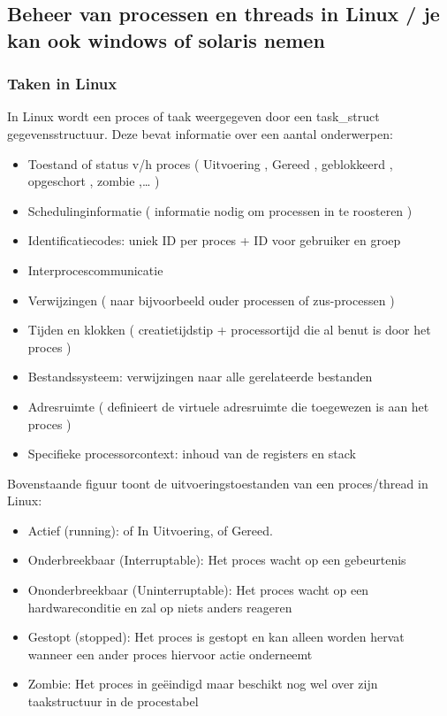 \subsection{Beheer van processen en threads in Linux / je kan ook windows of solaris nemen}

\subsubsection{Taken in Linux}

In Linux wordt een proces of taak weergegeven door een task\_struct gegevensstructuur. Deze bevat informatie over een aantal onderwerpen:

















\begin{itemize}
\item Toestand of status v/h proces ( Uitvoering , Gereed , geblokkeerd , opgeschort , zombie ,… )
\item Schedulinginformatie ( informatie nodig om processen in te roosteren )
\item Identificatiecodes: uniek ID per proces + ID voor gebruiker en groep
\item Interprocescommunicatie
\item Verwijzingen ( naar bijvoorbeeld ouder processen of zus-processen )
\item Tijden en klokken ( creatietijdstip + processortijd die al benut is door het proces )
\item Bestandssysteem: verwijzingen naar alle gerelateerde bestanden
\item Adresruimte ( definieert de virtuele adresruimte die toegewezen is aan het proces )
\item Specifieke processorcontext: inhoud van de registers en stack
\end{itemize}

Bovenstaande figuur toont de uitvoeringstoestanden van een proces/thread in Linux:

\begin{itemize}
\item Actief (running): of In Uitvoering, of Gereed.
\item Onderbreekbaar (Interruptable): Het proces wacht op een gebeurtenis
\item Ononderbreekbaar (Uninterruptable): Het proces wacht op een hardwareconditie en zal op niets anders reageren
\item Gestopt (stopped): Het proces is gestopt en kan alleen worden hervat wanneer een ander proces hiervoor actie onderneemt
\item Zombie: Het proces in geëindigd maar beschikt nog wel over zijn taakstructuur in de procestabel
\end{itemize}

